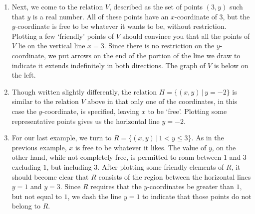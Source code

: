 {\begin{enumerate}

\item  Next, we come to the relation $V$,  described as the set of points $(3,y)$ such that $y$ is a real number.  All of these points have an $x$-coordinate of $3$, but the $y$-coordinate is free to be whatever it wants to be, without restriction.  Plotting a few `friendly' points of $V$ should convince you that all the points of $V$ lie on the vertical line $x = 3$.  Since there is no restriction on the $y$-coordinate, we put arrows on the end of the portion of the line we draw to indicate it extends indefinitely in both directions.  The graph of $V$ is below on the left.

\item  Though written slightly differently, the relation $H = \{ (x,y) \, | \, y = -2 \}$ is similar to the relation $V$ above in that only one of the coordinates, in this case the $y$-coordinate, is specified, leaving $x$ to be `free'.  Plotting some representative points gives us the horizontal line $y=-2$.




\item  For our last example, we turn to $R = \{ (x,y) \, | \, 1 < y \leq 3 \}$.  As in the previous example, $x$ is free to be whatever it likes. The value of $y$, on the other hand, while not completely free, is permitted to roam between $1$ and $3$ excluding $1$, but including $3$. After plotting some friendly elements of $R$, it should become clear that $R$ consists of the region between the horizontal lines $y = 1$ and $y = 3$.  Since $R$ requires that the $y$-coordinates be greater than $1$, but not equal to $1$, we dash the line $y = 1$ to indicate that those points do not belong to $R$. 


\end{enumerate}}

